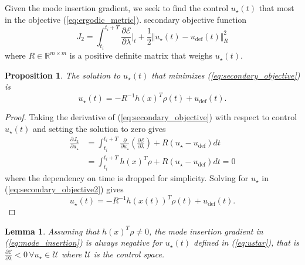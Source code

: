 \documentclass[letterpaper, 10 pt, conference]{ieeeconf}  %
\newtheorem{proposition}{Proposition}
\newtheorem{lemma}{Lemma}
\begin{document}
Given the mode insertion gradient, we seek to find the control $u_\star(t)$ that  most  in the objective (\ref{eq:ergodic_metric}).
 secondary objective function 
\begin{equation}\label{eq:secondary_objective}
J_2 = \int_{t_i}^{t_i + T} \frac{\partial \mathcal{E}}{\partial \lambda}\Big \vert_t + \frac{1}{2}\Vert u_\star(t) - u_\text{def}(t) \Vert_R^2
\end{equation}
where $R \in \mathbb{R}^{m \times m}$ is a positive definite matrix that weighs $u_\star(t)$.
\begin{proposition}
The solution to $u_\star(t)$ that minimizes (\ref{eq:secondary_objective}) is
\begin{equation} \label{eq:ustar}
u_\star(t) = -R^{-1} h(x)^T \rho(t) + u_\text{def}(t).
\end{equation}
\end{proposition}
\begin{proof}
Taking the derivative of (\ref{eq:secondary_objective}) with respect to control $u_\star(t)$ and setting the solution to zero gives
\begin{align}\label{eq:secondary_objective2}
\frac{\partial J_2}{\partial u_\star} & = \int_{t_i}^{t_i + T} \frac{\partial }{\partial u_\star} \left( \frac{\partial \mathcal{E}}{\partial \lambda}\right) + R(u_\star - u_\text{def}) dt \nonumber \\
& = \int_{t_i}^{t_i + T}  h(x)^T\rho + R(u_\star - u_\text{def}) dt = 0
\end{align}
where the dependency on time is dropped for simplicity.
Solving for $u_\star$ in (\ref{eq:secondary_objective2}) gives
\begin{equation*}
u_\star(t) = -R^{-1}h(x(t))^T\rho(t) + u_\text{def}(t).
\end{equation*}
\end{proof}
\begin{lemma}\label{lemma:mode_insert}
Assuming that $h(x)^T \rho \neq 0$, the mode insertion gradient in (\ref{eq:mode_insertion}) is always negative for $u_\star(t)$ defined in (\ref{eq:ustar}), that is $\frac{\partial \mathcal{E}}{\partial \lambda} < 0 \,  \forall u_\star \in \mathcal{U}$ where $\mathcal{U}$ is the control space.
\end{lemma}
\end{document}
